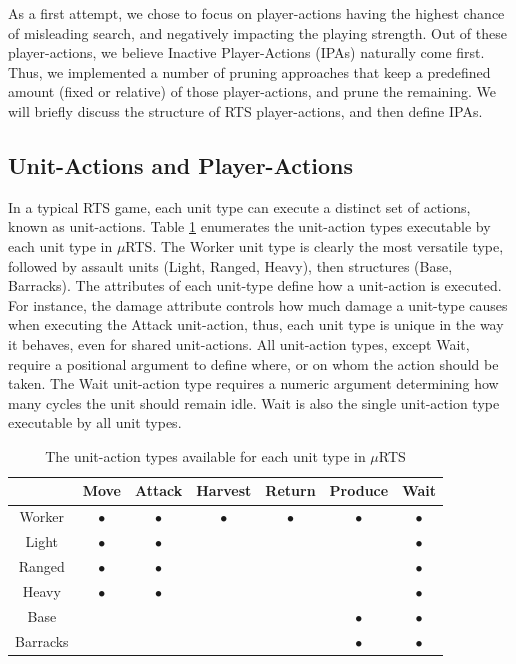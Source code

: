 \documentclass[conference]{IEEEtran}
\newcommand{\mRTS}{$\mu$RTS}
\begin{document}
As a first attempt, we chose to focus on player-actions having the highest chance of misleading search, and negatively impacting the playing strength. Out of these player-actions, we believe Inactive Player-Actions (IPAs) naturally come first. Thus, we implemented a number of pruning approaches that keep a predefined amount (fixed or relative) of those player-actions, and prune the remaining. We will briefly discuss the structure of RTS player-actions, and then define IPAs.


\subsection{Unit-Actions and Player-Actions}

In a typical RTS game, each unit type can execute a distinct set of actions, known as unit-actions. Table \ref{unitActionsTable} enumerates the unit-action types executable by each unit type in \mRTS{}. The Worker unit type is clearly the most versatile type, followed by assault units (Light, Ranged, Heavy), then structures (Base, Barracks). The attributes of each unit-type define how a unit-action is executed. For instance, the damage attribute controls how much damage a unit-type causes when executing the Attack unit-action, thus, each unit type is unique in the way it behaves, even for shared unit-actions. All unit-action types, except Wait, require a positional argument to define where, or on whom the action should be taken. The Wait unit-action type requires a numeric argument determining how many cycles the unit should remain idle. Wait is also the single unit-action type executable by all unit types.

\begin{table}[!h]
\renewcommand{\arraystretch}{1.3}
\caption{The unit-action types available for each unit type in \mRTS{}}
\label{unitActionsTable}
\centering
\begin{tabular}{c|c|c|c|c|c|c}
\cline{2-7}
\multicolumn{1}{c|}{} & Move & Attack & Harvest & Return & Produce & Wait \\
\hline \hline
Worker   & $\bullet$ & $\bullet$ & $\bullet$ & $\bullet$ & $\bullet$ & $\bullet$ \\
Light    & $\bullet$ & $\bullet$ & & & & $\bullet$ \\
Ranged   & $\bullet$ & $\bullet$ & & & & $\bullet$ \\
Heavy    & $\bullet$ & $\bullet$ & & & & $\bullet$ \\
Base     & & & & & $\bullet$ & $\bullet$ \\
Barracks & & & & & $\bullet$ & $\bullet$ \\
\hline
\end{tabular}
\end{table}
\end{document}

